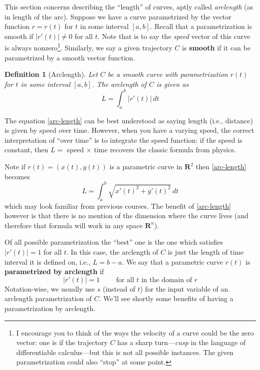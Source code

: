 \documentclass[12pt]{article}
\numberwithin{equation}{subsection}
\numberwithin{figure}{subsection}
\newtheorem{defn}[subsection]{Definition}
\theoremstyle{note}
\begin{document}
{This section concerns describing the ``length'' of curves, aptly called \textit{arclength} (as in length of the arc). Suppose we have a curve parametrized by the vector function $r=r(t)$ for $t$ in some interval $[a,b]$. %
Recall that a parametrization is smooth if $|r'(t)|\neq 0$ for all $t$. Note that is to say the \textit{speed} vector of this curve is always nonzero\footnote{I encourage you to think of the ways the velocity of a curve could be the zero vector: one is if the trajectory $C$ has a sharp turn---\textit{cusp} in the language of differentiable calculus---but this is not all possible instances. The given parametrization could also ``stop'' at some point.}.  Similarly, we say a given trajectory $C$ is \textbf{smooth} if it can be parametrized by a smooth vector function.

\begin{defn}[Arclength] Let $C$ be a smooth curve with parametrization $r(t)$ for $t$ in some interval $[a,b]$. The \textit{arclength} of $C$ is given as  
\begin{equation} \label{arc-length}
	L = \int_a^b |r'(t)| \,dt
\end{equation}
\end{defn}
The equation \eqref{arc-length} can be best understood as saying length (i.e., distance) is given by speed over time. However, when you have a varying speed, the correct interpretation of ``over time'' is to integrate the speed function: if the speed is constant, then $L=$ speed $\times$ time recovers the classic formula from physics. 

Note if $r(t)=(x(t), y(t))$ is a parametric curve in $\mathbf{R}^2$ then \eqref{arc-length} becomes \begin{equation} L = \int_a^b \sqrt{x'(t)^2 +y'(t)^2}\,dt\end{equation} which may look familiar from previous courses. The benefit of \eqref{arc-length} however is that there is no mention of the dimension where the curve lives (and therefore that formula will work in any space $\mathbf{R}^n$). 

Of all possible parametrization the ``best'' one is the one which satisfies $|r'(t)|=1$ for all $t$. In this case, the arclength of $C$ is just the length of time interval it is defined on, i.e., $L=b-a$. We say that a parametric curve $r(t)$ is \textbf{parametrized by arclength} if \begin{equation} |r'(t)|=1 \qquad \text{ for all $t$ in the domain of $r$} \end{equation}  Notation-wise, we usually use $s$ (instead of $t$) for the input variable of an arclength parametrization of $C$. We'll see shortly some benefits of having a parametrization by arclength. 
 
}
\end{document}
